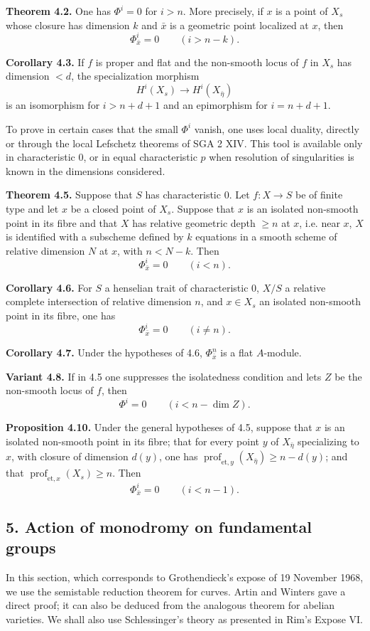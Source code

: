 \documentclass[11pt]{article}
\providecommand{\et}{\mathrm{et}}
\providecommand{\prof}{\operatorname{prof}}
\begin{document}
\textbf{Theorem 4.2.} One has $\Phi^i=0$ for $i>n$. More precisely, if $x$ is a point of $X_s$ whose closure has dimension $k$ and $\bar x$ is a geometric point localized at $x$, then
\[
 \Phi^i_{\bar x}=0\qquad (i>n-k).
\]

\textbf{Corollary 4.3.} If $f$ is proper and flat and the non-smooth locus of $f$ in $X_s$ has dimension $<d$, the specialization morphism
\[
H^i(X_s)\longrightarrow H^i(X_{\bar\eta})
\]
is an isomorphism for $i>n+d+1$ and an epimorphism for $i=n+d+1$.

To prove in certain cases that the small $\Phi^i$ vanish, one uses local duality, directly or through the local Lefschetz theorems of SGA 2 XIV. This tool is available only in characteristic $0$, or in equal characteristic $p$ when resolution of singularities is known in the dimensions considered.

\textbf{Theorem 4.5.} Suppose that $S$ has characteristic $0$. Let $f:X\to S$ be of finite type and let $x$ be a closed point of $X_s$. Suppose that $x$ is an isolated non-smooth point in its fibre and that $X$ has relative geometric depth $\ge n$ at $x$, i.e. near $x$, $X$ is identified with a subscheme defined by $k$ equations in a smooth scheme of relative dimension $N$ at $x$, with $n<N-k$. Then
\[
 \Phi^i_{\bar x}=0\qquad (i<n).
\]

\textbf{Corollary 4.6.} For $S$ a henselian trait of characteristic $0$, $X/S$ a relative complete intersection of relative dimension $n$, and $x\in X_s$ an isolated non-smooth point in its fibre, one has
\[
 \Phi^i_{\bar x}=0\qquad (i\ne n).
\]

\textbf{Corollary 4.7.} Under the hypotheses of 4.6, $\Phi^n_{\bar x}$ is a flat $A$-module.

\textbf{Variant 4.8.} If in 4.5 one suppresses the isolatedness condition and lets $Z$ be the non-smooth locus of $f$, then
\[
 \Phi^i=0\qquad (i<n-\dim Z).
\]

\textbf{Proposition 4.10.} Under the general hypotheses of 4.5, suppose that $x$ is an isolated non-smooth point in its fibre; that for every point $y$ of $X_{\bar\eta}$ specializing to $x$, with closure of dimension $d(y)$, one has $\prof_{\et,y}(X_{\bar\eta})\ge n-d(y)$; and that $\prof_{\et,x}(X_s)\ge n$. Then
\[
 \Phi^i_{\bar x}=0\qquad (i<n-1).
\]

\subsection*{5. Action of monodromy on fundamental groups}
In this section, which corresponds to Grothendieck's expose of 19 November 1968, we use the semistable reduction theorem for curves. Artin and Winters gave a direct proof; it can also be deduced from the analogous theorem for abelian varieties. We shall also use Schlessinger's theory as presented in Rim's Expose VI.
\end{document}
